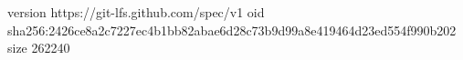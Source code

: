 version https://git-lfs.github.com/spec/v1
oid sha256:2426ce8a2c7227ec4b1bb82abae6d28c73b9d99a8e419464d23ed554f990b202
size 262240
